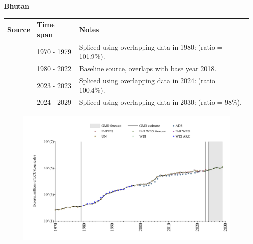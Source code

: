 \documentclass[12pt,a4paper,landscape]{article}
\begin{document}
\begin{adjustbox}{max totalsize={\paperwidth}{\paperheight},center}
\begin{minipage}[t][\textheight][t]{\textwidth}
\vspace*{0.5cm}
{}
\begin{center}
{\Large\bfseries Bhutan}
\end{center}
\vspace{0.5cm}
\begin{table}[H]
\centering
\small
\begin{tabular}{|l|l|l|}
\hline
\textbf{Source} & \textbf{Time span} & \textbf{Notes} \\
\hline
\rowcolor{white}\cite{UN}& 1970 - 1979 &Spliced using overlapping data in 1980: (ratio = 101.9\%).\\
\rowcolor{lightgray}\cite{WDI}& 1980 - 2022 &Baseline source, overlaps with base year 2018.\\
\rowcolor{white}\cite{ADB}& 2023 - 2023 &Spliced using overlapping data in 2024: (ratio = 100.4\%).\\
\rowcolor{lightgray}\cite{IMF_WEO_forecast}& 2024 - 2029 &Spliced using overlapping data in 2030: (ratio = 98\%).\\
\hline
\end{tabular}
\end{table}
\begin{figure}[H]
\centering
\includegraphics[width=\textwidth,height=0.6\textheight,keepaspectratio]{graphs/BTN_exports.pdf}
\end{figure}
\end{minipage}
\end{adjustbox}
\end{document}
